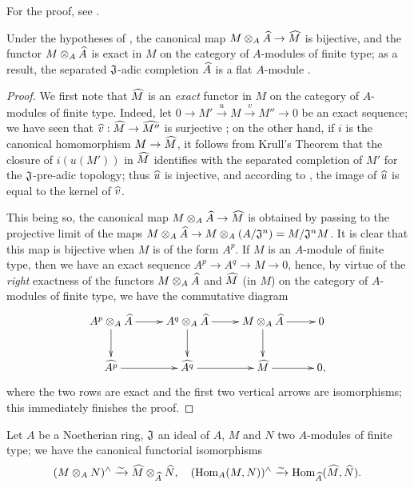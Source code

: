 For the proof, see \cite[p.~2--04]{I-1}.

\begin{cor}[7.3.3]
\label{0.7.3.3}
Under the hypotheses of , the canonical map
$M\otimes_A\widehat{A}\to\widehat{M}$ is bijective, and the functor $M\otimes_A\widehat{A}$
is exact in $M$ on the category of $A$-modules of finite type; as a result, the separated
$\mathfrak{J}$-adic completion $\widehat{A}$ is a flat $A$-module
.
\end{cor}

\begin{proof}
\label{proof-0.7.3.3}
We first note that $\widehat{M}$ is an \emph{exact} functor in $M$ on the category of
$A$-modules of finite type. Indeed, let $0\to M'\xrightarrow{u}M\xrightarrow{v}M''\to 0$ be
an exact sequence; we have seen that $\widehat{v}:\widehat{M}\to\widehat{M''}$ is surjective
; on the other hand, if $i$ is the canonical homomorphism
$M\to\widehat{M}$, it follows from Krull's Theorem  that the
closure of $i(u(M'))$ in $\widehat{M}$ identifies with the separated completion of $M'$ for
the $\mathfrak{J}$-pre-adic topology; thus $\widehat{u}$ is injective, and according to
, the image of $\widehat{u}$ is equal to the kernel of
$\widehat{v}$.

This being so, the canonical map $M\otimes_A\widehat{A}\to\widehat{M}$ is obtained by passing
to the projective limit of the maps
$M\otimes_A\widehat{A}\to M\otimes_A(A/\mathfrak{J}^n)=M/\mathfrak{J}^n M$. It is clear that
this map is bijective when $M$ is of the form $A^p$. If $M$ is an $A$-module of finite type,
then we have an exact sequence $A^p\to A^q\to M\to 0$, hence, by virtue of the \emph{right}
exactness of the functors $M\otimes_A\widehat{A}$ and $\widehat{M}$ (in $M$) on the category
of $A$-modules of finite type, we have the commutative diagram
\[
  \xymatrix{
    A^p\otimes_A\wh{A}\ar[r]\ar[d] &
    A^q\otimes_A\wh{A}\ar[r]\ar[d] &
    M\otimes_A\wh{A}\ar[r]\ar[d] &
    0\\
    \wh{A^p}\ar[r] &
    \wh{A^q}\ar[r] &
    \wh{M}\ar[r] &
    0,
  }
\]
where the two rows are exact and the first two vertical arrows are isomorphisms; this
immediately finishes the proof.
\end{proof}

\begin{cor}[7.3.4]
\label{0.7.3.4}
Let $A$ be a Noetherian ring, $\mathfrak{J}$ an ideal of $A$, $M$ and $N$ two $A$-modules of
finite type; we have the canonical functorial isomorphisms
\[
  (M\otimes_A N)^\wedge\xrightarrow{\sim}\widehat{M}\otimes_{\widehat{A}}\widehat{N},
  \quad
  ({\mathop{\mathrm{Hom}}\nolimits}_A(M,N))^\wedge\xrightarrow{\sim}{\mathop{\mathrm{Hom}}\nolimits}_{\widehat{A}}(\widehat{M},\widehat{N}).
\]
\end{cor}


